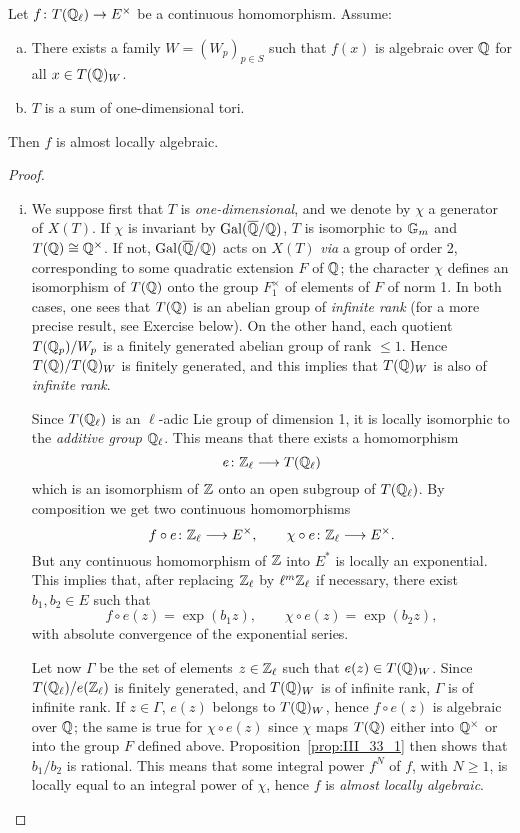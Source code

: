 \begin{prop}\label{prop:III_33_2}
	Let $f\colon T(\mathbb{Q}_\ell) \to E^\times$ be a continuous homomorphism. Assume:
	\begin{enumerate}[(a)]
	\item There exists a family $W = (W_p)_{p\in S}$ such that $f(x)$ is
		algebraic over $\mathbb{Q}$ for all $x \in T(\mathbb{Q})_W$.
	\item\label{item:III_33_2b}
		$T$ is a sum of one-dimensional tori.
	\end{enumerate}
	Then $f$ is almost locally algebraic.
\end{prop}
\begin{proof}
\begin{enumerate}[i)]
\item\label{item:III_33_2i}
	We suppose first that $T$ is \emph{one-dimensional}, and we denote by
	$\chi$ a generator of $X(T)$. If $\chi$ is invariant by
	$\operatorname{Gal}(\overline{\mathbb{Q}}/\mathbb{Q})$, $T$ is isomorphic to $\mathbb{G}_m$ and $T(\mathbb{Q}) \cong
	\mathbb{Q}^\times$. If not, $\operatorname{Gal}(\overline{\mathbb{Q}}/\mathbb{Q})$ acts on $X(T)$ \emph{via} a group of
	order 2, corresponding to some quadratic
	\dpage
	extension $F$ of $\mathbb{Q}$; the character $\chi$ defines an isomorphism of
	$T(\mathbb{Q})$ onto the group $F_1^\times$ of elements of $F$ of norm 1. In both
	cases, one sees that $T(\mathbb{Q})$ is an abelian group of \emph{infinite
	rank} (for a more precise result, see Exercise below). On the other
	hand, each quotient $T(\mathbb{Q}_p)/W_p$ is a finitely generated abelian group
	of rank $\le 1$.  Hence $T(\mathbb{Q})/T(\mathbb{Q})_W$ is finitely generated, and this
	implies that $T(\mathbb{Q})_W$ is also of \emph{infinite rank}.

	Since $T(\mathbb{Q}_\ell)$ is an $\ell$-adic Lie group of dimension 1, it is
	locally isomorphic to the \emph{additive group} $\mathbb{Q}_\ell$. This means
	that there exists a homomorphism
	\[
		e \colon \mathbb{Z}_\ell \longrightarrow T(\mathbb{Q}_\ell)
	\]
	which is an isomorphism of $\mathbb{Z}$ onto an open subgroup of $T(\mathbb{Q}_\ell)$.
	By composition we get two continuous homomorphisms
	\[
		f \circ e\colon \mathbb{Z}_\ell \longrightarrow E^\times, \qquad
		\chi \circ e\colon \mathbb{Z}_\ell \longrightarrow E^\times.
	\]
	But any continuous homomorphism of $\mathbb{Z}$ into $E^*$ is locally an
	exponential. This implies that, after replacing $\mathbb{Z}_\ell$ by $\ell^m
	\mathbb{Z}_\ell$ if necessary, there exist $b_1, b_2 \in E$ such that
	\[
		f \circ e(z) = \exp(b_1 z), \qquad
		\chi\circ e(z) = \exp(b_2 z),
	\]
	with absolute convergence of the exponential series.

	Let now $\Gamma$ be the set of elements $z \in \mathbb{Z}_\ell$ such that $e(z)
	\in T(\mathbb{Q})_W$. Since $T(\mathbb{Q}_\ell)/e(\mathbb{Z}_\ell)$ is finitely generated, and
	$T(\mathbb{Q})_W$ is of infinite rank, $\Gamma$ is of infinite rank. If $z \in
	\Gamma$, $e(z)$
	\dpage
	belongs to $T(\mathbb{Q})_W$, hence $f \circ e(z)$ is algebraic over $\mathbb{Q}$; the
	same is true for $\chi\circ e(z)$ since $\chi$ maps $T(\mathbb{Q})$ either into
	$\mathbb{Q}^\times$ or into the group $F$ defined above.
	Proposition~\ref{prop:III_33_1} then shows that $b_1/b_2$ is rational.
	This means that some integral power $f^N$ of $f$, with $N \ge 1$, is
	locally equal to an integral power of $\chi$, hence $f$ is \emph{almost
	locally algebraic}.


\end{enumerate}
\end{proof}
